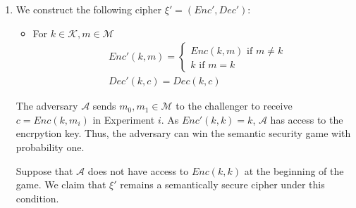 \documentclass[11pt]{article}
\begin{document}
\begin{enumerate}
  \item  We construct the following cipher $\xi' = (Enc', Dec')$:
  \begin{itemize}
    \item For $k \in \mathcal{K}, m \in \mathcal{M}$
    \begin{align*}
      & Enc'(k, m) = \begin{cases}
                      Enc(k,m) \text{ if } m \neq k \\
                      k \text{ if } m = k
                   \end{cases} \\
      & Dec'(k, c) = Dec(k, c)
    \end{align*}
  \end{itemize}

  The adversary $\mathcal{A}$ sends $m_0, m_1 \in \mathcal{M}$ to the challenger to receive $c = Enc(k,m_i)$ in Experiment $i$. As $Enc'(k,k) = k$, $\mathcal{A}$ has access to the encrpytion key. Thus, the adversary can win the semantic security game with probability one.

  Suppose that $\mathcal{A}$ does not have access to $Enc(k,k)$ at the beginning of the game. We claim that $\xi'$ remains a semantically secure cipher under this condition.


\end{enumerate}
\end{document}
